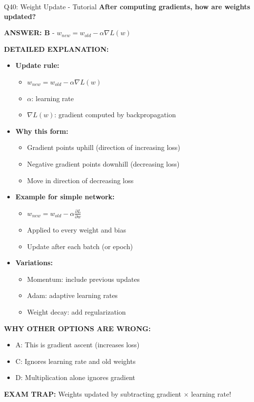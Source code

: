 \documentclass[8pt]{beamer}
\begin{document}
	\begin{frame}{Q40: Weight Update - Tutorial}
		\fontsize{6.5}{7.5}\selectfont
		\textbf{After computing gradients, how are weights updated?}
		
		\vspace{0.05cm}
		\textcolor{myblue}{\textbf{ANSWER: B}} - $w_{new} = w_{old} - \alpha \nabla L(w)$
		
		\vspace{0.05cm}
		\textbf{DETAILED EXPLANATION:}
		\begin{itemize}
			\item \textbf{Update rule:}
			\begin{itemize}
				\item $w_{new} = w_{old} - \alpha \nabla L(w)$
				\item $\alpha$: learning rate
				\item $\nabla L(w)$: gradient computed by backpropagation
			\end{itemize}
			\item \textbf{Why this form:}
			\begin{itemize}
				\item Gradient points uphill (direction of increasing loss)
				\item Negative gradient points downhill (decreasing loss)
				\item Move in direction of decreasing loss
			\end{itemize}
			\item \textbf{Example for simple network:}
			\begin{itemize}
				\item $w_{new} = w_{old} - \alpha \frac{\partial L}{\partial w}$
				\item Applied to every weight and bias
				\item Update after each batch (or epoch)
			\end{itemize}
			\item \textbf{Variations:}
			\begin{itemize}
				\item Momentum: include previous updates
				\item Adam: adaptive learning rates
				\item Weight decay: add regularization
			\end{itemize}
		\end{itemize}
		
		\vspace{0.05cm}
		\textcolor{myred}{\textbf{WHY OTHER OPTIONS ARE WRONG:}}
		\begin{itemize}
			\item \textcolor{myred}{A:} This is gradient ascent (increases loss)
			\item \textcolor{myred}{C:} Ignores learning rate and old weights
			\item \textcolor{myred}{D:} Multiplication alone ignores gradient
		\end{itemize}
		
		\textcolor{myred}{\textbf{EXAM TRAP:}} Weights updated by \textcolor{myblue}{subtracting} gradient $\times$ learning rate!
	\end{frame}
	
\end{document}
